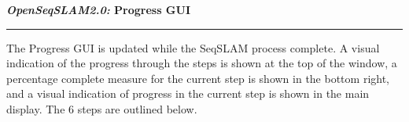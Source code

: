 \centerline{\textbf{\textit{OpenSeqSLAM2.0:} Progress GUI}}
\noindent\rule{\textwidth}{2pt}
\bigskip
\parbox{\textwidth}{The Progress GUI is updated while the SeqSLAM process complete. A visual indication of the progress through the steps is shown at the top of the window, a percentage complete measure for the current step is shown in the bottom right, and a visual indication of progress in the current step is shown in the main display. The 6 steps are outlined below.}
\bigskip
